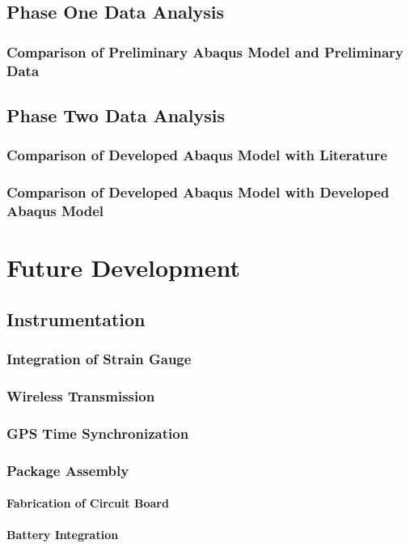 \documentclass[12pt]{report}
\begin{document}
	\section{Phase One Data Analysis}
		\subsection{Comparison of Preliminary Abaqus Model and Preliminary Data}
	\section{Phase Two Data Analysis}
		\subsection{Comparison of Developed Abaqus Model with Literature}
		\subsection{Comparison of Developed Abaqus Model with Developed Abaqus Model}	
		
\chapter{Future Development}
	\section{Instrumentation}
		\subsection{Integration of Strain Gauge}
			
		\subsection{Wireless Transmission}
		\subsection{GPS Time Synchronization}
		\subsection{Package Assembly}
			\subsubsection{Fabrication of Circuit Board}
			\subsubsection{Battery Integration}
\end{document}
